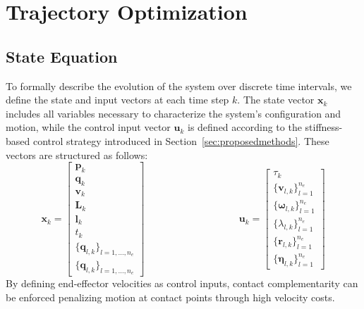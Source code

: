 \documentclass[main.tex]{subfiles}
\begin{document}
\begin{sloppypar}
\section{Trajectory Optimization}
\label{sec:formulation}
\subsection{State Equation}
To formally describe the evolution of the system over discrete time intervals, we define the state and input vectors at each time step \( k \). The state vector \( \mathbf{x}_k \) includes all variables necessary to characterize the system’s configuration and motion, while the control input vector \( \mathbf{u}_k \) is defined according to the stiffness-based control strategy introduced in Section~\ref{sec:proposedmethods}. These vectors are structured as follows:
\begin{equation}
\label{eq:state_input}
\mathbf{x}_k =
\begin{bmatrix}
\mathbf{p}_k \\
\mathbf{q}_k \\
\mathbf{v}_k \\
\mathbf{L}_k \\
\mathbf{l}_k \\
t_k \\
\{\mathbf{q}_{l,k}\}_{l=1,\ldots,n_e} \\
\{\mathbf{q}_{l,k}\}_{l=1,\ldots,n_e}
\end{bmatrix}
\hspace{4cm}
\mathbf{u}_k =
\begin{bmatrix}
\tau_k \\
\{\mathbf{v}_{l,k}\}_{l=1}^{n_e} \\
\{\boldsymbol{\omega}_{l,k}\}_{l=1}^{n_e} \\
\{\lambda_{l,k}\}_{l=1}^{n_e} \\
\{\mathbf{r}_{l,k}\}_{l=1}^{n_e} \\
\{\boldsymbol{\eta}_{l,k}\}_{l=1}^{n_e}
\end{bmatrix}
\end{equation}
By defining end-effector velocities as control inputs, contact complementarity can be enforced penalizing motion at contact points through high velocity costs.

\end{sloppypar}
\end{document}
